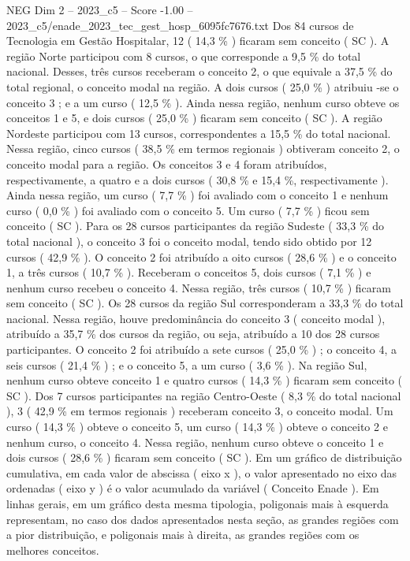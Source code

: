 \begin{textsample}{NEG Dim 2 – 2023\_c5 – Score -1.00 – 2023\_c5/enade\_2023\_tec\_gest\_hosp\_6095fc7676.txt}
Dos 84 cursos de Tecnologia em Gestão Hospitalar, 12 ( 14,3 \% ) ficaram sem conceito ( SC ).
A região Norte participou com 8 cursos, o que corresponde a 9,5 \% do total nacional.
Desses, três cursos receberam o conceito 2, o que equivale a 37,5 \% do total regional, o conceito modal na região.
A dois cursos ( 25,0 \% ) atribuiu -se o conceito 3 ; e a um curso ( 12,5 \% ).
Ainda nessa região, nenhum curso obteve os conceitos 1 e 5, e dois cursos ( 25,0 \% ) ficaram sem conceito ( SC ).
A região Nordeste participou com 13 cursos, correspondentes a 15,5 \% do total nacional.
Nessa região, cinco cursos ( 38,5 \% em termos regionais ) obtiveram conceito 2, o conceito modal para a região.
Os conceitos 3 e 4 foram atribuídos, respectivamente, a quatro e a dois cursos ( 30,8 \% e 15,4 \%, respectivamente ).
Ainda nessa região, um curso ( 7,7 \% ) foi avaliado com o conceito 1 e nenhum curso ( 0,0 \% ) foi avaliado com o conceito 5.
Um curso ( 7,7 \% ) ficou sem conceito ( SC ).
Para os 28 cursos participantes da região Sudeste ( 33,3 \% do total nacional ), o conceito 3 foi o conceito modal, tendo sido obtido por 12 cursos ( 42,9 \% ).
O conceito 2 foi atribuído a oito cursos ( 28,6 \% ) e o conceito 1, a três cursos ( 10,7 \% ).
Receberam o conceitos 5, dois cursos ( 7,1 \% ) e nenhum curso recebeu o conceito 4.
Nessa região, três cursos ( 10,7 \% ) ficaram sem conceito ( SC ).
Os 28 cursos da região Sul corresponderam a 33,3 \% do total nacional.
Nessa região, houve predominância do conceito 3 ( conceito modal ), atribuído a 35,7 \% dos cursos da região, ou seja, atribuído a 10 dos 28 cursos participantes.
O conceito 2 foi atribuído a sete cursos ( 25,0 \% ) ; o conceito 4, a seis cursos ( 21,4 \% ) ; e o conceito 5, a um curso ( 3,6 \% ).
Na região Sul, nenhum curso obteve conceito 1 e quatro cursos ( 14,3 \% ) ficaram sem conceito ( SC ).
Dos 7 cursos participantes na região Centro-Oeste ( 8,3 \% do total nacional ), 3 ( 42,9 \% em termos regionais ) receberam conceito 3, o conceito modal.
Um curso ( 14,3 \% ) obteve o conceito 5, um curso ( 14,3 \% ) obteve o conceito 2 e nenhum curso, o conceito 4.
Nessa região, nenhum curso obteve o conceito 1 e dois cursos ( 28,6 \% ) ficaram sem conceito ( SC ).
Em um gráfico de distribuição cumulativa, em cada valor de abscissa ( eixo x ), o valor apresentado no eixo das ordenadas ( eixo y ) é o valor acumulado da variável ( Conceito Enade ).
Em linhas gerais, em um gráfico desta mesma tipologia, poligonais mais à esquerda representam, no caso dos dados apresentados nesta seção, as grandes regiões com a pior distribuição, e poligonais mais à direita, as grandes regiões com os melhores conceitos.

\end{textsample}
